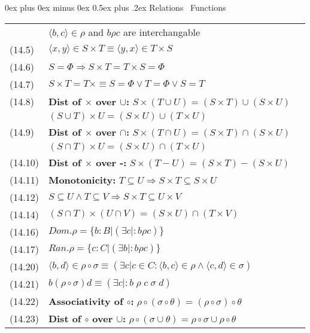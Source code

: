 \documentclass[letterpaper, 8pt]{extarticle}
\makeatletter
\renewcommand{\section}{\@startsection{section}{1}{0mm}%
                                {0ex plus 0ex minus 0ex}%
                                {0.5ex plus .2ex}%
                                {\normalfont\normalsize\bfseries}}
\makeatother
\begin{document}
\begin{multicols*}{3}
    \section{Relations \ Functions}
    \begin{tabulary}{\linewidth}{@{}lLL@{}}
        & $\langle b, c \rangle \in \rho$ and $b \rho c$ are interchangable \\
        (14.5) & $\langle x, y \rangle \in S \times T \equiv \langle y, x \rangle \in T \times S$ &\\
        (14.6) & $S = \Phi \Rightarrow S \times T = T \times S = \Phi$ &\\
        (14.7) & $S \times T = T \times \equiv S = \Phi \lor T = \Phi \lor S = T$ &\\
        (14.8) &\textbf{Dist of $\times$ over $\cup$: } $S \times (T \cup U) = (S \times T) \cup (S \times U)$& \\
         & $(S \cup T) \times U = (S \times U) \cup (T \times U)$ &\\
        (14.9) &\textbf{Dist of $\times$ over $\cap$: } $S \times (T \cap U) = (S \times T) \cap (S \times U)$& \\
         & $(S \cap T) \times U = (S \times U) \cap (T \times U)$ &\\
        (14.10) &\textbf{Dist of $\times$ over -: } $S \times (T - U) = (S \times T) - (S \times U)$& \\
        (14.11) &\textbf{Monotonicity: } $T \subseteq U \Rightarrow S \times T \subseteq S \times U$& \\
        (14.12) & $S \subseteq U \land T \subseteq V \Rightarrow S \times T \subseteq U \times V$ &\\
        (14.14) & $(S \cap T) \times (U \cap V) = (S \times U) \cap (T \times V)$ &\\
        (14.16) & $Dom.\rho = \{b:B| (\exists c|: b \rho c)\}$ &\\
        (14.17) & $Ran.\rho = \{c:C| (\exists b|: b \rho c)\}$ &\\
        (14.20) & $\langle b, d \rangle \in \rho \circ \sigma \equiv (\exists c| c \in C: \langle b, c \rangle \in \rho \land \langle c, d \rangle \in \sigma)$ &\\
        (14.21) & $b (\rho \circ \sigma) d \equiv (\exists c|: b \; \rho \; c \; \sigma \; d)$ &\\
        (14.22) & \textbf{Associativity of $\circ$:}   $\rho \circ (\sigma \circ \theta) = (\rho \circ \sigma) \circ \theta$&\\
        (14.23) & \textbf{Dist of $\circ$ over $\cup$:}  $\rho \circ (\sigma \cup \theta) = \rho \circ \sigma \cup \rho \circ \theta$&\\

\end{tabulary}
\end{multicols*}
\end{document}

